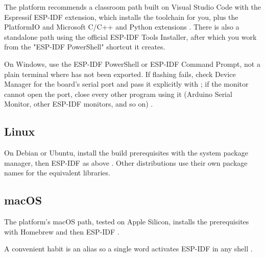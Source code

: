 The platform recommends a classroom path built on Visual Studio Code with the
Espressif ESP-IDF extension, which installs the toolchain for you, plus the
PlatformIO and Microsoft C/C++ and Python extensions \citep{prg32repo}. There is
also a standalone path using the official ESP-IDF Tools Installer, after which you
work from the "ESP-IDF PowerShell" shortcut it creates.



\begin{prgwarn}
On Windows, use the ESP-IDF PowerShell or ESP-IDF Command Prompt, not a plain
terminal where  has not been exported. If flashing fails, check Device
Manager for the board's serial port and pass it explicitly with ; if
the monitor cannot open the port, close every other program using it (Arduino
Serial Monitor, other ESP-IDF monitors, and so on) \citep{prg32repo}.
\end{prgwarn}

\subsection{Linux}

On Debian or Ubuntu, install the build prerequisites with the system package
manager, then ESP-IDF as above \citep{prg32repo}. Other distributions use their own
package names for the equivalent libraries.



\subsection{macOS}

The platform's macOS path, tested on Apple Silicon, installs the prerequisites with
Homebrew and then ESP-IDF \citep{prg32repo}.



A convenient habit is an alias so a single word activates ESP-IDF in any shell
\citep{prg32repo}.

